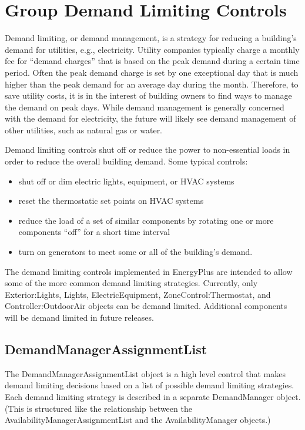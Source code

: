 \section{Group Demand Limiting Controls}\label{group-demand-limiting-controls}

Demand limiting, or demand management, is a strategy for reducing a building's demand for utilities, e.g., electricity. Utility companies typically charge a monthly fee for ``demand charges'' that is based on the peak demand during a certain time period. Often the peak demand charge is set by one exceptional day that is much higher than the peak demand for an average day during the month. Therefore, to save utility costs, it is in the interest of building owners to find ways to manage the demand on peak days. While demand management is generally concerned with the demand for electricity, the future will likely see demand management of other utilities, such as natural gas or water.

Demand limiting controls shut off or reduce the power to non-essential loads in order to reduce the overall building demand. Some typical controls:

\begin{itemize}
\item
  shut off or dim electric lights, equipment, or HVAC systems
\item
  reset the thermostatic set points on HVAC systems
\item
  reduce the load of a set of similar components by rotating one or more components ``off'' for a short time interval
\item
  turn on generators to meet some or all of the building's demand.
\end{itemize}

The demand limiting controls implemented in EnergyPlus are intended to allow some of the more common demand limiting strategies. Currently, only Exterior:Lights, Lights, ElectricEquipment, ZoneControl:Thermostat, and Controller:OutdoorAir objects can be demand limited. Additional components will be demand limited in future releases.

\subsection{DemandManagerAssignmentList}\label{demandmanagerassignmentlist}

The DemandManagerAssignmentList object is a high level control that makes demand limiting decisions based on a list of possible demand limiting strategies. Each demand limiting strategy is described in a separate DemandManager object. (This is structured like the relationship between the AvailabilityManagerAssignmentList and the AvailabilityManager objects.)

